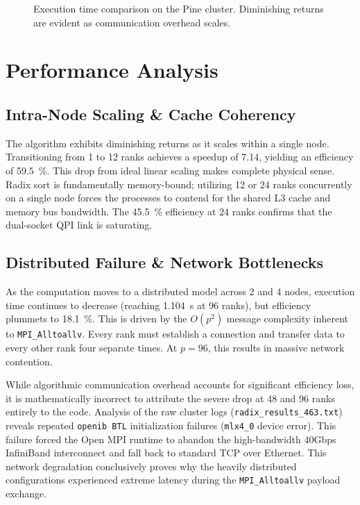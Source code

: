 \documentclass[11pt]{article}
\begin{document}
\begin{figure}[H]
  \centering
  \caption{Execution time comparison on the Pine cluster. Diminishing returns are evident as communication overhead scales.}
\end{figure}

\section{Performance Analysis}

\subsection{Intra-Node Scaling \& Cache Coherency}
The algorithm exhibits diminishing returns as it scales within a single node. Transitioning from 1 to 12 ranks achieves a speedup of 7.14, yielding an efficiency of \SI{59.5}{\percent}. This drop from ideal linear scaling makes complete physical sense. Radix sort is fundamentally memory-bound; utilizing 12 or 24 ranks concurrently on a single node forces the processes to contend for the shared L3 cache and memory bus bandwidth. The \SI{45.5}{\percent} efficiency at 24 ranks confirms that the dual-socket QPI link is saturating.

\subsection{Distributed Failure \& Network Bottlenecks}
As the computation moves to a distributed model across 2 and 4 nodes, execution time continues to decrease (reaching \SI{1.104}{\second} at 96 ranks), but efficiency plummets to \SI{18.1}{\percent}. This is driven by the $O(p^2)$ message complexity inherent to \texttt{MPI\_Alltoallv}. Every rank must establish a connection and transfer data to every other rank four separate times. At $p=96$, this results in massive network contention.

While algorithmic communication overhead accounts for significant efficiency loss, it is mathematically incorrect to attribute the severe drop at 48 and 96 ranks entirely to the code. Analysis of the raw cluster logs (\texttt{radix\_results\_463.txt}) reveals repeated \texttt{openib BTL} initialization failures (\texttt{mlx4\_0} device error). This failure forced the Open MPI runtime to abandon the high-bandwidth 40Gbps InfiniBand interconnect and fall back to standard TCP over Ethernet. This network degradation conclusively proves why the heavily distributed configurations experienced extreme latency during the \texttt{MPI\_Alltoallv} payload exchange.
\end{document}
